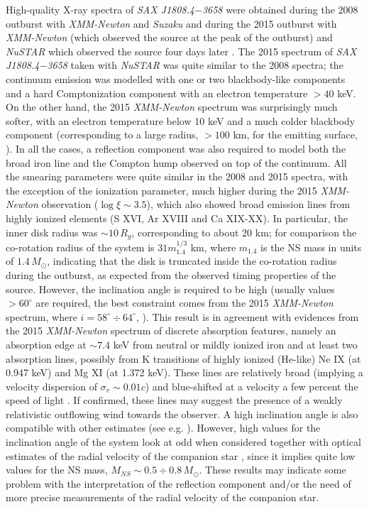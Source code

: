 \documentclass[graybox]{svmult}
\def \xmm {{\em XMM-Newton\xspace}}
\def \suzaku {{\em Suzaku\xspace}}
\def \saxj{{\em SAX J1808.4$-$3658\xspace}}
\def \nustar{{\em NuSTAR\xspace}}
\begin{document}
High-quality X-ray spectra of \saxj{} were obtained during the 2008 outburst with \xmm{} \cite{Papitto2009} and \suzaku{} \cite{Cackett2009} and during the 2015 outburst with \xmm{} (which observed the source at the peak of the outburst) and \nustar{} which observed the source four days later \cite{DiSalvo2019}. The 2015 spectrum of \saxj{} taken with \nustar{} was quite similar to the 2008 spectra; the continuum emission was modelled with one or two blackbody-like components and a hard Comptonization component with an electron temperature $> 40$ keV. On the other hand, the 2015 \xmm{} spectrum was surprisingly much softer, with an electron temperature below 10 keV and a much colder blackbody component (corresponding to a large radius, $> 100$ km, for the emitting surface, \cite{DiSalvo2019}). 
In all the cases, a reflection component was also required to model both the broad iron line and the Compton hump observed on top of the continuum. All the smearing parameters were quite similar in the 2008 and 2015 spectra, with the exception of the ionization parameter, much higher during the 2015 \xmm{} observation ($\log \xi \sim 3.5$),
which also showed broad emission lines from highly ionized elements (S XVI, Ar XVIII and Ca XIX-XX). In particular, the inner disk radius was $\sim 10\, R_g$, corresponding to about 20 km; for comparison the co-rotation radius of the system is $31 m_{1.4}^{1/3}$ km, where $m_{1.4}$ is the NS mass in units of $1.4\, M_\odot$, indicating that the disk is truncated inside the co-rotation radius during the outburst, as expected from the observed timing properties of the source. 
However, the inclination angle is required to be high (usually values $> 60^\circ$ are required, the best constraint comes from the 2015 \xmm{} spectrum, where $i = 58^\circ \div 64^\circ$, \cite{DiSalvo2019}). This result is in agreement with evidences from the 2015 \xmm{} spectrum of discrete absorption features, namely an absorption edge at $\sim 7.4$ keV from neutral or mildly ionized iron and at least two absorption lines, possibly from K transitions of highly ionized (He-like) Ne IX (at 0.947 keV) and Mg XI (at 1.372 keV). These lines are relatively broad (implying a velocity dispersion of $\sigma_v \sim 0.01c$) and blue-shifted at a velocity a few percent the speed of light \cite{DiSalvo2019}. If confirmed, these lines may suggest the presence of a weakly relativistic outflowing wind towards the observer. A high inclination angle is also compatible with other estimates (see e.g. \cite{Ibragimov2009,Deloye2008,Bildsten2001,Wang2013}). However, high values for the inclination angle of the system look at odd when considered together with optical estimates of the radial velocity of the companion star \cite{Elebert2008,Cornelisse2009}, since it implies quite low values for the NS mass, $M_{NS} \sim 0.5 \div 0.8\, M_\odot$. These results may indicate some problem with the interpretation of the reflection component and/or the need of more precise measurements of the radial velocity of the companion star. 
\end{document}
